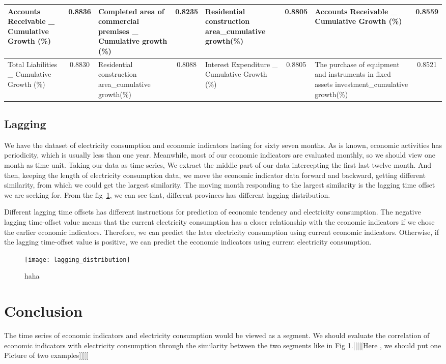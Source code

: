 \documentclass{sig-alternate-05-2015}
\begin{document}
\begin{table*}
\begin{tabular}{|p{3cm}|c|p{3cm}|c|p{3cm}|c|p{3cm}|c|}
	Accounts Receivable \_ Cumulative Growth (\%)& 0.8836& Completed area of commercial premises \_ Cumulative growth (\%) & 0.8235&Residential construction area\_cumulative growth(\%) & 0.8805 &Accounts Receivable \_ Cumulative Growth (\%)& 0.8559\\ \hline
	Total Liabilities \_ Cumulative Growth (\%)& 0.8830 & Residential construction area\_cumulative growth(\%)&0.8088 & Interest Expenditure \_ Cumulative Growth (\%)&0.8805 & The purchase of equipment and instruments in fixed assets investment\_cumulative growth(\%) & 0.8521\\ \hline
\end{tabular}
\end{table*}

\subsection{Lagging}
We have the dataset of electricity consumption and economic indicators lasting for sixty seven months. As is known, economic activities has 
periodicity, which is usually less than one year. Meanwhile, most of our economic indicators are evaluated monthly, so we should view one month as time unit. Taking our data as time series, We extract the middle part of our data intercepting the first last twelve month. And then, keeping the length of electricity consumption data, we move the economic indicator data forward and backward, getting different similarity, from which we could get the largest similarity. The moving month responding to the largest similarity is the lagging time offset we are seeking for. From the fig~\ref{fig:lagdis}, we can see that, different provinces has different lagging distribution.
 
Different lagging time offsets has different instructions for prediction of economic tendency and electricity consumption. The negative lagging time-offset value means that the current electricity consumption has a closer relationship with the economic indicators if we chose the earlier economic indicators. Therefore, we can predict the later electricity consumption using current economic indicators. Otherwise, if the lagging time-offset value is positive, we can predict the economic indicators using current electricity consumption.   
\begin{figure}
	\centering
	\texttt{[image: lagging\_distribution]}
	\caption{haha}
	\label{fig:lagdis}
\end{figure}
\section{Conclusion}
The time series of economic indicators and electricity consumption would be viewed as a segment. We should evaluate the correlation of economic indicators with electricity consumption through the similarity between the two segments like in Fig 1.[[[[[Here , we should  put one Picture of two examples]]]]] 
\end{document}
